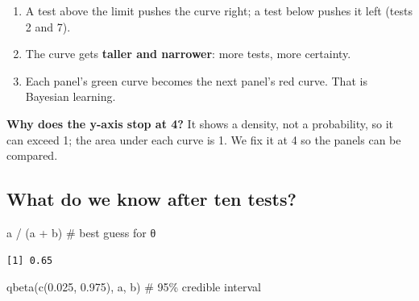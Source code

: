 \documentclass[
  letterpaper,
  DIV=11,
  numbers=noendperiod]{scrartcl}
\newenvironment{Shaded}{\begin{snugshade}}{\end{snugshade}}
\newcommand{\CommentTok}[1]{\textcolor[rgb]{0.37,0.37,0.37}{#1}}
\newcommand{\FloatTok}[1]{\textcolor[rgb]{0.68,0.00,0.00}{#1}}
\newcommand{\FunctionTok}[1]{\textcolor[rgb]{0.28,0.35,0.67}{#1}}
\newcommand{\NormalTok}[1]{\textcolor[rgb]{0.00,0.23,0.31}{#1}}
\newcommand{\SpecialCharTok}[1]{\textcolor[rgb]{0.37,0.37,0.37}{#1}}
\providecommand{\tightlist}{%
  \setlength{\itemsep}{0pt}\setlength{\parskip}{0pt}}
\begin{document}
\begin{enumerate}
\def\labelenumi{\arabic{enumi}.}
\tightlist
\item
  A test above the limit pushes the curve right; a test below pushes it
  left (tests 2 and 7).
\item
  The curve gets \textbf{taller and narrower}: more tests, more
  certainty.
\item
  Each panel's green curve becomes the next panel's red curve. That is
  Bayesian learning.
\end{enumerate}

\begin{tcolorbox}[enhanced jigsaw, colbacktitle=quarto-callout-note-color!10!white, leftrule=.75mm, colframe=quarto-callout-note-color-frame, bottomrule=.15mm, left=2mm, titlerule=0mm, title=\textcolor{quarto-callout-note-color}{\faInfo}\hspace{0.5em}{Note}, rightrule=.15mm, bottomtitle=1mm, colback=white, toptitle=1mm, coltitle=black, arc=.35mm, breakable, toprule=.15mm, opacitybacktitle=0.6, opacityback=0]

\textbf{Why does the y-axis stop at 4?} It shows a density, not a
probability, so it can exceed 1; the area under each curve is 1. We fix
it at 4 so the panels can be compared.

\end{tcolorbox}

\subsection{What do we know after ten
tests?}\label{what-do-we-know-after-ten-tests}

\begin{Shaded}
\begin{Highlighting}[]
\NormalTok{a }\SpecialCharTok{/}\NormalTok{ (a }\SpecialCharTok{+}\NormalTok{ b)                                      }\CommentTok{\# best guess for θ}
\end{Highlighting}
\end{Shaded}

\begin{verbatim}
[1] 0.65
\end{verbatim}

\begin{Shaded}
\begin{Highlighting}[]
\FunctionTok{qbeta}\NormalTok{(}\FunctionTok{c}\NormalTok{(}\FloatTok{0.025}\NormalTok{, }\FloatTok{0.975}\NormalTok{), a, b)                     }\CommentTok{\# 95\% credible interval}
\end{Highlighting}
\end{Shaded}
\end{document}
